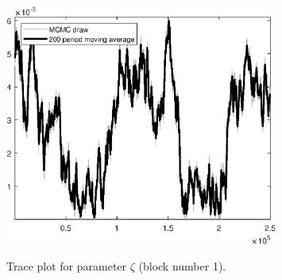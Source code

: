\begin{figure}[H]
\centering
  \includegraphics[width=0.8\textwidth]{BRS_imp_mobility/graphs/TracePlot_zeta_blck_1}\\
    \caption{Trace plot for parameter ${\zeta}$ (block number 1).}
\end{figure}
